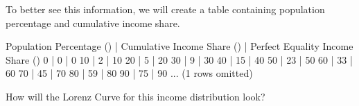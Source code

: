 \documentclass[letterpaper,10pt,english]{jupyterBook}
\begin{document}
\sphinxAtStartPar
To better see this information, we will create a table containing population percentage and cumulative income share.

\begin{sphinxVerbatim}[commandchars=\\\{\}]
  
        
        
       
\end{sphinxVerbatim}

\begin{sphinxVerbatim}[commandchars=\\\{\}]
Population Percentage (\PYGZpc{}) | Cumulative Income Share (\PYGZpc{}) | Perfect Equality Income Share (\PYGZpc{})
0                         | 0                           | 0
10                        | 2                           | 10
20                        | 5                           | 20
30                        | 9                           | 30
40                        | 15                          | 40
50                        | 23                          | 50
60                        | 33                          | 60
70                        | 45                          | 70
80                        | 59                          | 80
90                        | 75                          | 90
... (1 rows omitted)
\end{sphinxVerbatim}

\sphinxAtStartPar
How will the Lorenz Curve for this income distribution look?

\noindent{}
\end{document}
